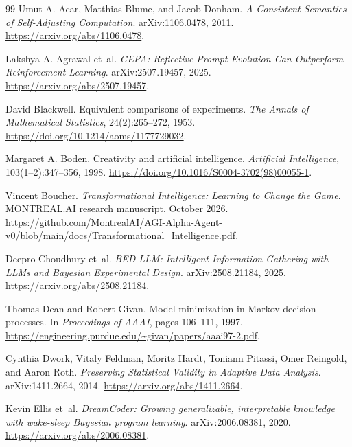 \documentclass[11pt,letterpaper]{article}
\theoremstyle{remark}\newtheorem{remark}{Remark}[section]
\begin{document}
\normalsize

\clearpage
\begin{thebibliography}{99}
\setlength{\itemsep}{0.04em}\setlength{\parsep}{0pt}\fontsize{9.7}{11.5}\selectfont
{}
Umut A. Acar, Matthias Blume, and Jacob Donham. \emph{A Consistent Semantics of Self-Adjusting Computation}. arXiv:1106.0478, 2011. \url{https://arxiv.org/abs/1106.0478}.

Lakshya A. Agrawal et~al. \emph{GEPA: Reflective Prompt Evolution Can Outperform Reinforcement Learning}. arXiv:2507.19457, 2025. \url{https://arxiv.org/abs/2507.19457}.

David Blackwell. Equivalent comparisons of experiments. \emph{The Annals of Mathematical Statistics}, 24(2):265--272, 1953. \url{https://doi.org/10.1214/aoms/1177729032}.

Margaret A. Boden. Creativity and artificial intelligence. \emph{Artificial Intelligence}, 103(1--2):347--356, 1998. \url{https://doi.org/10.1016/S0004-3702(98)00055-1}.

Vincent Boucher. \emph{Transformational Intelligence: Learning to Change the Game}. MONTREAL.AI research manuscript, October 2026. \url{https://github.com/MontrealAI/AGI-Alpha-Agent-v0/blob/main/docs/Transformational_Intelligence.pdf}.

Deepro Choudhury et~al. \emph{BED-LLM: Intelligent Information Gathering with LLMs and Bayesian Experimental Design}. arXiv:2508.21184, 2025. \url{https://arxiv.org/abs/2508.21184}.

Thomas Dean and Robert Givan. Model minimization in Markov decision processes. In \emph{Proceedings of AAAI}, pages 106--111, 1997. \url{https://engineering.purdue.edu/~givan/papers/aaai97-2.pdf}.

Cynthia Dwork, Vitaly Feldman, Moritz Hardt, Toniann Pitassi, Omer Reingold, and Aaron Roth. \emph{Preserving Statistical Validity in Adaptive Data Analysis}. arXiv:1411.2664, 2014. \url{https://arxiv.org/abs/1411.2664}.

Kevin Ellis et~al. \emph{DreamCoder: Growing generalizable, interpretable knowledge with wake-sleep Bayesian program learning}. arXiv:2006.08381, 2020. \url{https://arxiv.org/abs/2006.08381}.


\end{thebibliography}
\end{document}

